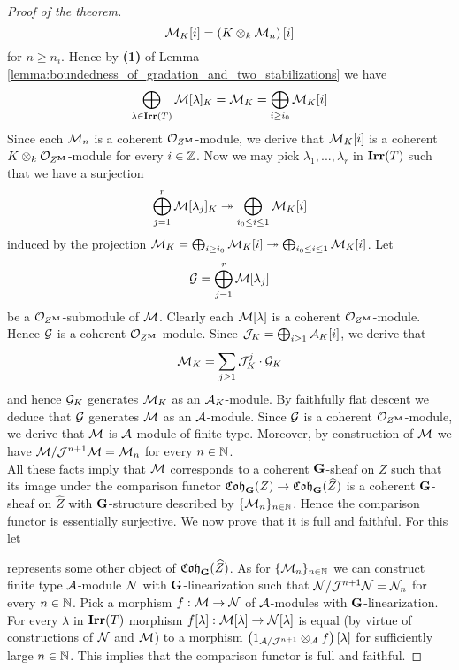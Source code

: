 \begin{proof}[Proof of the theorem]
$${\mathcal M}_K[i] = \left(K\otimes_k{\mathcal M}_n\right)[i]$$
for $n\geq n_i$. Hence by \textbf{(1)} of Lemma \ref{lemma:boundedness_of_gradation_and_two_stabilizations} we have
$$\bigoplus_{\lambda\in \mathbf{Irr}(T)}{\mathcal M}[\lambda]_K = {\mathcal M}_K = \bigoplus_{i\geq i_0}{\mathcal M}_K[i]$$
Since each ${\mathcal M}_n$ is a coherent ${\mathcal O}_{Z^{\mathbf{M}}}$-module, we derive that ${\mathcal M}_K[i]$ is a coherent $K\otimes_k{\mathcal O}_{Z^{\mathbf{M}}}$-module for every $i\in {\mathbb Z}$. Now we may pick $\lambda_1,...,\lambda_r$ in $\mathbf{Irr}(T)$ such that we have a surjection
$$\bigoplus_{j=1}^r{\mathcal M}[\lambda_j]_K \twoheadrightarrow \bigoplus_{i_0\leq i\leq 1}{\mathcal M}_K[i]$$
induced by the projection ${\mathcal M}_K = \bigoplus_{i\geq i_0}{\mathcal M}_K[i]\twoheadrightarrow \bigoplus_{i_0\leq i\leq 1}{\mathcal M}_K[i]$. Let
$${\mathcal G} = \bigoplus_{j=1}^r{\mathcal M}[\lambda_j]$$
be a ${\mathcal O}_{Z^{\mathbf{M}}}$-submodule of ${\mathcal M}$. Clearly each ${\mathcal M}[\lambda]$ is a coherent ${\mathcal O}_{Z^{\mathbf{M}}}$-module. Hence ${\mathcal G}$ is a coherent ${\mathcal O}_{Z^{\mathbf{M}}}$-module. Since ${\mathcal J}_K = \bigoplus_{i\geq 1}{\mathcal A}_K[i]$, we derive that
$${\mathcal M}_K = \sum_{j\geq 1}{\mathcal J}_K^j\cdot {\mathcal G}_K$$
and hence ${\mathcal G}_K$ generates ${\mathcal M}_K$ as an ${\mathcal A}_K$-module. By faithfully flat descent we deduce that ${\mathcal G}$ generates ${\mathcal M}$ as an ${\mathcal A}$-module. Since ${\mathcal G}$ is a coherent ${\mathcal O}_{Z^{\mathbf{M}}}$-module, we derive that ${\mathcal M}$ is ${\mathcal A}$-module of finite type. Moreover, by construction of ${\mathcal M}$ we have ${\mathcal M}/{\mathcal J}^{n+1}{\mathcal M} = {\mathcal M}_{n}$ for every $n\in {\mathbb N}$.\\
All these facts imply that ${\mathcal M}$ corresponds to a coherent $\mathbf{G}$-sheaf on $Z$ such that its image under the comparison functor $\mathfrak{Coh}_{\mathbf{G}}(Z)\rightarrow \mathfrak{Coh}_{\mathbf{G}}(\widehat{Z})$ is a coherent $\mathbf{G}$-sheaf on $\widehat{Z}$ with $\mathbf{G}$-structure described by $\{{\mathcal M}_n\}_{n\in {\mathbb N}}$. Hence the comparison functor is essentially surjective. We now prove that it is full and faithful. For this let
\begin{center}
\end{center}
represents some other object of $\mathfrak{Coh}_{\mathbf{G}}(\widehat{Z})$. As for $\{{\mathcal M}_n\}_{n\in {\mathbb N}}$ we can construct finite type ${\mathcal A}$-module ${\mathcal N}$ with $\mathbf{G}$-linearization such that ${\mathcal N}/{\mathcal J}^{n+1}{\mathcal N} = {\mathcal N}_n$ for every $n\in {\mathbb N}$. Pick a morphism $f:{\mathcal M}\rightarrow {\mathcal N}$ of ${\mathcal A}$-modules with $\mathbf{G}$-linearization. For every $\lambda$ in $\mathbf{Irr}(T)$ morphism $f[\lambda]:{\mathcal M}[\lambda]\rightarrow {\mathcal N}[\lambda]$ is equal (by virtue of constructions of ${\mathcal N}$ and ${\mathcal M}$) to a morphism $\left(1_{{\mathcal A}/{\mathcal J}^{n+1}}\otimes_{{\mathcal A}}f\right)[\lambda]$ for sufficiently large $n\in {\mathbb N}$. This implies that the comparison functor is full and faithful.
\end{proof}


